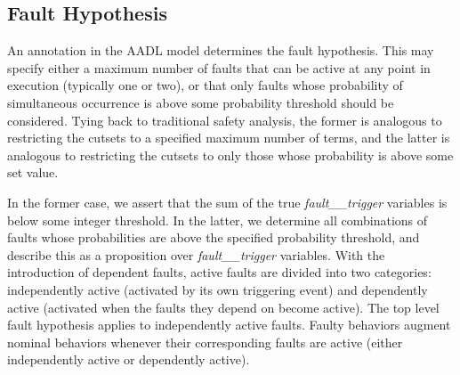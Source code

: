 \subsection{Fault Hypothesis}
\vspace{-0.2in}
An annotation in the AADL model determines the fault hypothesis. This may specify either a maximum number of faults that can be active at any point in execution (typically one or two), or that only faults whose probability of simultaneous occurrence is above some probability threshold should be considered. Tying back to traditional safety analysis, the former is analogous to restricting the cutsets to a specified maximum number of terms, and the latter is analogous to restricting the cutsets to only those whose probability is above some set value.

In the former case, we assert that the sum of the true {\em fault\_\_trigger} variables is below some integer threshold.  In the latter, we determine all combinations of faults whose probabilities are above the specified probability threshold, and describe this as a proposition over {\em fault\_\_trigger} variables. 
%
With the introduction of dependent faults, active faults are divided into two categories: independently active (activated by its own triggering event) and dependently active (activated when the faults they depend on become active). The top level fault hypothesis applies to independently active faults. Faulty behaviors augment nominal behaviors whenever their corresponding faults are active (either independently active or dependently active).












